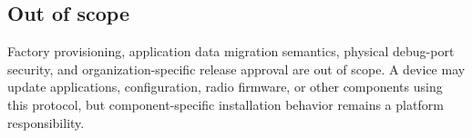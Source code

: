 \subsection{Out of scope}

Factory provisioning, application data migration semantics, physical debug-port
security, and organization-specific release approval are out of scope. A device
may update applications, configuration, radio firmware, or other components
using this protocol, but component-specific installation behavior remains a
platform responsibility.

